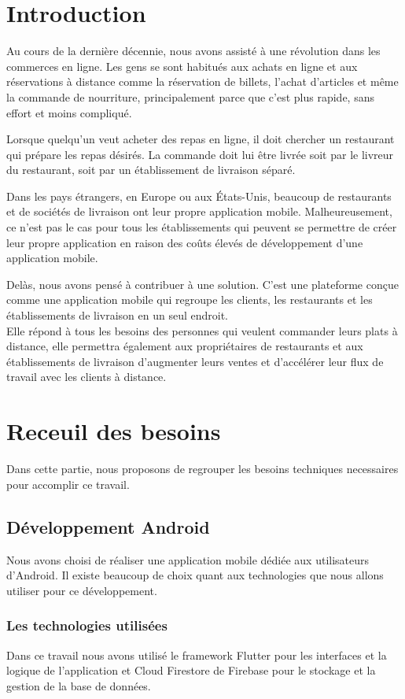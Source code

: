 \documentclass[french, a4paper, 12pt]{report}
\begin{document}
\newpage
\chapter*{Introduction}
    Au cours de la dernière décennie, nous avons assisté à une révolution dans les commerces en ligne. Les gens se sont habitués aux achats en ligne et aux réservations à distance comme la réservation de billets, l'achat d'articles et même la commande de nourriture, principalement parce que c'est plus rapide, sans effort et moins compliqué.

Lorsque quelqu'un veut acheter des repas en ligne, il doit chercher un restaurant qui prépare les repas désirés. La commande doit lui être livrée soit par le livreur du restaurant, soit par un établissement de livraison séparé.

Dans les pays étrangers, en Europe ou aux États-Unis, beaucoup de restaurants et de sociétés de livraison ont leur propre application mobile. Malheureusement, ce n'est pas le cas pour tous les établissements qui peuvent se permettre de créer leur propre application en raison des coûts élevés de développement d'une application mobile.

Delàs, nous avons pensé à contribuer à une solution. C'est une plateforme conçue comme une application mobile qui regroupe les clients, les restaurants et les établissements de livraison en un seul endroit. \\Elle répond à tous les besoins des personnes qui veulent commander leurs plats à distance, elle permettra également aux propriétaires de restaurants et aux établissements de livraison d'augmenter leurs ventes et d'accélérer leur flux de travail avec les clients à distance.


\newpage
\chapter{Receuil des besoins} Dans cette partie, nous proposons de regrouper les besoins techniques necessaires pour accomplir ce travail.
	\section{Développement Android} Nous avons choisi de réaliser une application mobile dédiée aux utilisateurs d'Android. Il existe beaucoup de choix quant aux technologies que nous allons utiliser pour ce développement.
		\subsection{Les technologies utilisées} Dans ce travail nous avons utilisé le framework Flutter pour les interfaces et la logique de l'application et Cloud Firestore de Firebase pour le stockage et la gestion de la base de données.
\end{document}
